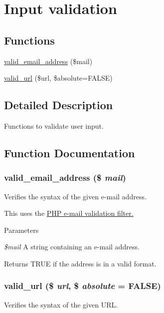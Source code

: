 \hypertarget{group__validation}{
\section{Input validation}
\label{group__validation}
}
\subsection*{Functions}
\begin{DoxyCompactItemize}
\item 
\hyperlink{group__validation_ga486c51f034746a76618602e1e76fa718}{valid\_\-email\_\-address} (\$mail)
\item 
\hyperlink{group__validation_gae9221d1759a8d5a2ba2db93ae3a6feff}{valid\_\-url} (\$url, \$absolute=FALSE)
\end{DoxyCompactItemize}


\subsection{Detailed Description}
Functions to validate user input. 

\subsection{Function Documentation}
\hypertarget{group__validation_ga486c51f034746a76618602e1e76fa718}{
\subsubsection[{valid\_\-email\_\-address}]{\setlength{\rightskip}{0pt plus 5cm}valid\_\-email\_\-address (\$ {\em mail})}}
\label{group__validation_ga486c51f034746a76618602e1e76fa718}
Verifies the syntax of the given e-\/mail address.

This uses the \hyperlink{}{PHP e-\/mail validation filter. }


\begin{DoxyParams}{Parameters}
\item[{\em \$mail}]A string containing an e-\/mail address.\end{DoxyParams}
\begin{DoxyReturn}{Returns}
TRUE if the address is in a valid format. 
\end{DoxyReturn}
\hypertarget{group__validation_gae9221d1759a8d5a2ba2db93ae3a6feff}{
\subsubsection[{valid\_\-url}]{\setlength{\rightskip}{0pt plus 5cm}valid\_\-url (\$ {\em url}, \/  \$ {\em absolute} = {\ttfamily FALSE})}}
\label{group__validation_gae9221d1759a8d5a2ba2db93ae3a6feff}
Verifies the syntax of the given URL.

